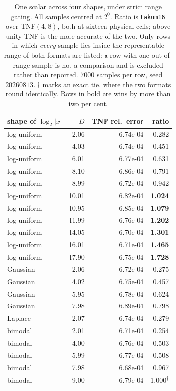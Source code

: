 \documentclass[11pt]{article}
\theoremstyle{definition}
\begin{document}
\begin{table}[htbp]\centering
\caption{One scalar across four shapes, under strict range gating. All samples
centred at $2^0$. Ratio is \texttt{takum16} over TNF$(4,8)$, both at sixteen
physical cells; above unity TNF is the more accurate of the two. Only rows in
which \emph{every} sample lies inside the representable range of both formats are
listed: a row with one out-of-range sample is not a comparison and is excluded
rather than reported. $7000$ samples per row, seed $20260813$. $\dagger$ marks an
exact tie, where the two formats round identically. Rows in bold are wins by more
than two per cent.}
\label{tab:invariant}
\begin{tabular}{lrrr}
\hline
shape of $\log_2|x|$ & $D$ & TNF rel.\ error & ratio \\
\hline
log-uniform & 2.06 & 6.74e-04 & 0.282 \\
log-uniform & 4.03 & 6.74e-04 & 0.451 \\
log-uniform & 6.01 & 6.77e-04 & 0.631 \\
log-uniform & 8.10 & 6.86e-04 & 0.791 \\
log-uniform & 8.99 & 6.72e-04 & 0.942 \\
log-uniform & 10.01 & 6.82e-04 & \textbf{1.024} \\
log-uniform & 10.95 & 6.85e-04 & \textbf{1.079} \\
log-uniform & 11.99 & 6.76e-04 & \textbf{1.202} \\
log-uniform & 14.05 & 6.70e-04 & \textbf{1.301} \\
log-uniform & 16.01 & 6.71e-04 & \textbf{1.465} \\
log-uniform & 17.90 & 6.75e-04 & \textbf{1.728} \\
\hline
Gaussian & 2.06 & 6.72e-04 & 0.275 \\
Gaussian & 4.02 & 6.75e-04 & 0.457 \\
Gaussian & 5.95 & 6.78e-04 & 0.624 \\
Gaussian & 7.98 & 6.89e-04 & 0.798 \\
\hline
Laplace & 2.07 & 6.74e-04 & 0.279 \\
\hline
bimodal & 2.01 & 6.71e-04 & 0.254 \\
bimodal & 4.00 & 6.76e-04 & 0.503 \\
bimodal & 5.99 & 6.77e-04 & 0.508 \\
bimodal & 7.98 & 6.68e-04 & 0.967 \\
bimodal & 9.00 & 6.79e-04 & 1.000$^{\dagger}$ \\

\end{tabular}
\end{table}
\end{document}
